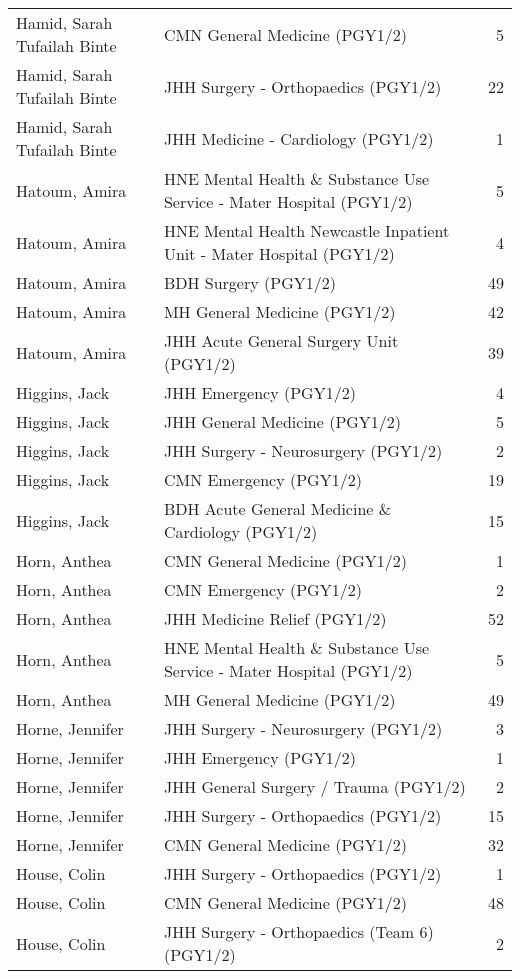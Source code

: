 \documentclass[
]{article}
\begin{document}
\begin{longtable}{llr}
Hamid, Sarah Tufailah Binte & CMN General Medicine (PGY1/2) & 5 \\ 
Hamid, Sarah Tufailah Binte & JHH Surgery - Orthopaedics (PGY1/2) & 22 \\ 
Hamid, Sarah Tufailah Binte & JHH Medicine - Cardiology (PGY1/2) & 1 \\ 
Hatoum, Amira & HNE Mental Health \& Substance Use Service - Mater Hospital (PGY1/2) & 5 \\ 
Hatoum, Amira & HNE Mental Health Newcastle Inpatient Unit - Mater Hospital (PGY1/2) & 4 \\ 
Hatoum, Amira & BDH Surgery (PGY1/2) & 49 \\ 
Hatoum, Amira & MH General Medicine (PGY1/2) & 42 \\ 
Hatoum, Amira & JHH Acute General Surgery Unit (PGY1/2) & 39 \\ 
Higgins, Jack & JHH Emergency (PGY1/2) & 4 \\ 
Higgins, Jack & JHH General Medicine (PGY1/2) & 5 \\ 
Higgins, Jack & JHH Surgery - Neurosurgery (PGY1/2) & 2 \\ 
Higgins, Jack & CMN Emergency (PGY1/2) & 19 \\ 
Higgins, Jack & BDH Acute General Medicine \& Cardiology (PGY1/2) & 15 \\ 
Horn, Anthea & CMN General Medicine (PGY1/2) & 1 \\ 
Horn, Anthea & CMN Emergency (PGY1/2) & 2 \\ 
Horn, Anthea & JHH Medicine Relief (PGY1/2) & 52 \\ 
Horn, Anthea & HNE Mental Health \& Substance Use Service - Mater Hospital (PGY1/2) & 5 \\ 
Horn, Anthea & MH General Medicine (PGY1/2) & 49 \\ 
Horne, Jennifer & JHH Surgery - Neurosurgery (PGY1/2) & 3 \\ 
Horne, Jennifer & JHH Emergency (PGY1/2) & 1 \\ 
Horne, Jennifer & JHH General Surgery / Trauma (PGY1/2) & 2 \\ 
Horne, Jennifer & JHH Surgery - Orthopaedics (PGY1/2) & 15 \\ 
Horne, Jennifer & CMN General Medicine (PGY1/2) & 32 \\ 
House, Colin & JHH Surgery - Orthopaedics (PGY1/2) & 1 \\ 
House, Colin & CMN General Medicine (PGY1/2) & 48 \\ 
House, Colin & JHH Surgery - Orthopaedics (Team 6) (PGY1/2) & 2 \\ 

\end{longtable}
\end{document}
